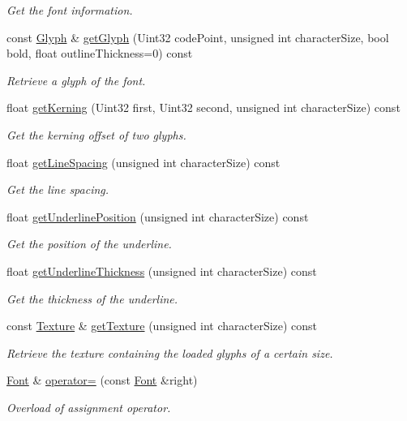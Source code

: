 \begin{DoxyCompactItemize}
\begin{DoxyCompactList}\small\item\em Get the font information. \end{DoxyCompactList}\item 
const \mbox{\hyperlink{classsf_1_1_glyph}{Glyph}} \& \mbox{\hyperlink{classsf_1_1_font_a308876e51e75bb69844fa3926a214fbf}{get\+Glyph}} (Uint32 code\+Point, unsigned int character\+Size, bool bold, float outline\+Thickness=0) const
\begin{DoxyCompactList}\small\item\em Retrieve a glyph of the font. \end{DoxyCompactList}\item 
float \mbox{\hyperlink{classsf_1_1_font_a5e1d5aca772d4765ce940670c2f786a6}{get\+Kerning}} (Uint32 first, Uint32 second, unsigned int character\+Size) const
\begin{DoxyCompactList}\small\item\em Get the kerning offset of two glyphs. \end{DoxyCompactList}\item 
float \mbox{\hyperlink{classsf_1_1_font_a4538cc8af337393208a87675fe1c3e59}{get\+Line\+Spacing}} (unsigned int character\+Size) const
\begin{DoxyCompactList}\small\item\em Get the line spacing. \end{DoxyCompactList}\item 
float \mbox{\hyperlink{classsf_1_1_font_a726a55f40c19ac108e348b103190caad}{get\+Underline\+Position}} (unsigned int character\+Size) const
\begin{DoxyCompactList}\small\item\em Get the position of the underline. \end{DoxyCompactList}\item 
float \mbox{\hyperlink{classsf_1_1_font_ad6d0a5bc6c026fe85c239f1f822b54e6}{get\+Underline\+Thickness}} (unsigned int character\+Size) const
\begin{DoxyCompactList}\small\item\em Get the thickness of the underline. \end{DoxyCompactList}\item 
const \mbox{\hyperlink{classsf_1_1_texture}{Texture}} \& \mbox{\hyperlink{classsf_1_1_font_a15528d289f91cfd4b2597f8a9423e612}{get\+Texture}} (unsigned int character\+Size) const
\begin{DoxyCompactList}\small\item\em Retrieve the texture containing the loaded glyphs of a certain size. \end{DoxyCompactList}\item 
\mbox{\hyperlink{classsf_1_1_font}{Font}} \& \mbox{\hyperlink{classsf_1_1_font_a232515549846e3172a514d0b47918399}{operator=}} (const \mbox{\hyperlink{classsf_1_1_font}{Font}} \&right)
\begin{DoxyCompactList}\small\item\em Overload of assignment operator. \end{DoxyCompactList}\end{DoxyCompactItemize}

